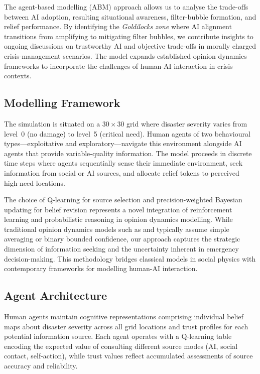 \documentclass[pdflatex,sn-apa]{sn-jnl}%
\begin{document}
The agent-based modelling (ABM) approach allows us to analyse the trade-offs between
AI adoption, resulting situational awareness, filter-bubble formation, and relief
performance.
By identifying the \emph{Goldilocks zone} where AI alignment transitions from
amplifying to mitigating filter bubbles, we contribute insights to ongoing discussions
on trustworthy AI and objective trade-offs in morally charged crisis-management
scenarios.
The model expands established opinion dynamics frameworks \citep{geschke2019triple}
to incorporate the challenges of human-AI interaction in crisis contexts.

\subsection{Modelling Framework}

The simulation is situated on a $30\times30$ grid where disaster severity varies from
level~0 (no damage) to level~5 (critical need).
Human agents of two behavioural types---exploitative and exploratory---navigate this
environment alongside AI agents that provide variable-quality information.
The model proceeds in discrete time steps where agents sequentially sense their
immediate environment, seek information from social or AI sources, and allocate
relief tokens to perceived high-need locations.

The choice of Q-learning for source selection and precision-weighted Bayesian updating
for belief revision represents a novel integration of reinforcement learning and
probabilistic reasoning in opinion dynamics modelling.
While traditional opinion dynamics models such as \citet{deffuant2000mixing} and
\citet{hegselmann2002opinion} typically assume simple averaging or binary bounded
confidence, our approach captures the strategic dimension of information seeking and
the uncertainty inherent in emergency decision-making.
This methodology bridges classical models in social physics with contemporary
frameworks for modelling human-AI interaction.

\subsection{Agent Architecture}

Human agents maintain cognitive representations comprising individual belief maps
about disaster severity across all grid locations and trust profiles for each
potential information source.
Each agent operates with a Q-learning table encoding the expected value of
consulting different source modes (AI, social contact, self-action), while trust
values reflect accumulated assessments of source accuracy and reliability.
\end{document}
